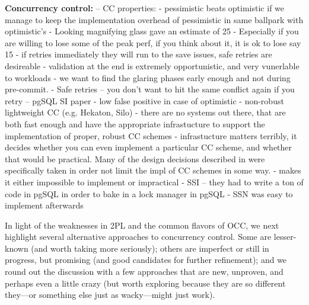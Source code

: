 {\bf Concurrency control:} 
-- CC properties:
- pessimistic beats optimistic if we manage to keep the implementation overhead of pessimistic in same ballpark with optimistic's
  - Looking magnifying glass gave an estimate of 25%
  - Especially if you are willing to lose some of the peak perf, if you think about it, it is ok to lose say 15%
- if retries immediately they will run to the save issues, safe retries are desireable 
  - validation at the end is extremely opportunistic, and very vunerlable to workloads
  - we want to find the glaring phases early enough and not during pre-commit.
- Safe retries -- you don't want to hit the same conflict again if you retry -- pgSQL SI paper 
  - low false positive in case of optimistic
  - non-robust lightweight CC (e.g. Hekaton, Silo)
- there are no systems out there, that are both fast enough and have the appropriate infrastucture to support the implementation of proper, robust CC schemes 
  - infrastucture matters terribly, it decides whether you can even implement a particular CC scheme, and whether that would be practical. Many of the design decisions described in  were specifically taken in order not limit the impl of CC schemes in some way.
    - makes it either impossible to implement or impractical
  - SSI -- they had to write a ton of code in pgSQL in order to bake in a lock manager in pgSQL
    - SSN was easy to implement afterwards 


In light of the weaknesses in 2PL and the common flavors of OCC, we next highlight several alternative approaches to concurrency control. Some are lesser-known (and worth taking more seriously); others are imperfect or still in progress, but promising (and good candidates for further refinement); and we round out the discussion with a few approaches that are new, unproven, and perhaps even a little crazy (but worth exploring because they are so different they---or something else just as wacky---might just work).


